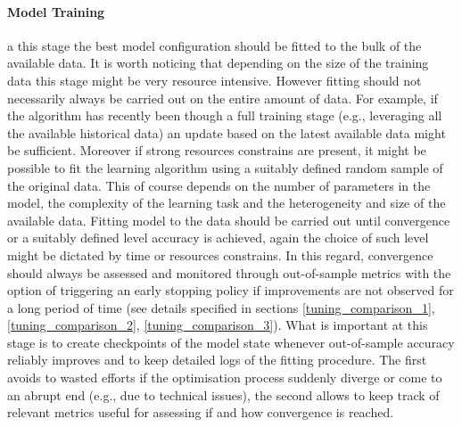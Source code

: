 \paragraph*{Model Training} a this stage the best model configuration should be fitted to the bulk of the available data. It is worth noticing that depending on the size of the training data this stage might be very resource intensive. However fitting should not necessarily always be carried out on the entire amount of data. For example, if the algorithm has recently been though a full training stage (e.g., leveraging all the available historical data) an update based on the latest available data might be sufficient. Moreover if strong resources constrains are present, it might be possible to fit the learning algorithm using a suitably defined random sample of the original data. This of course depends on the number of parameters in the model, the complexity of the learning task and the heterogeneity and size of the available data. Fitting model to the data should be carried out until convergence or a suitably defined level accuracy is achieved, again the choice of such level might be dictated by time or resources constrains. In this regard, convergence should always be assessed and monitored through out-of-sample metrics with the option of triggering an early stopping policy if improvements are not observed for a long period of time (see details specified in sections \ref{tuning_comparison_1}, \ref{tuning_comparison_2}, \ref{tuning_comparison_3}). What is important at this stage is to create checkpoints of the model state whenever out-of-sample accuracy reliably improves and to keep detailed logs of the fitting procedure. The first avoids to wasted efforts if the optimisation process suddenly diverge or come to an abrupt end (e.g., due to technical issues), the second allows to keep track of relevant metrics useful for assessing if and how convergence is reached.

